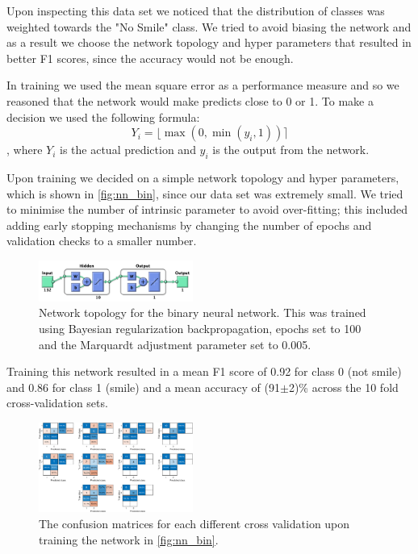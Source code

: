 \documentclass[%
 reprint,
 amsmath,amssymb,
 aps,
]{revtex4-1}
\newcommand{\round}[1]{\ensuremath{\lfloor#1\rceil}}
\begin{document}
\par{Upon inspecting this data set we noticed that the distribution of classes was weighted towards the "No Smile" class. We tried to avoid biasing the network and as a result we choose the network topology and hyper parameters that resulted in better F1 scores, since the accuracy would not be enough.}
\par{In training we used the mean square error as a performance measure and so we reasoned that the network would make predicts close to 0 or 1. To make a decision we used the following formula:
\begin{equation}
Y_i = \round{\max(0, \min(y_i, 1))}
\end{equation}
, where $Y_i$ is the actual prediction and $y_i$ is the output from the network.}
\par{Upon training we decided on a simple network topology and hyper parameters, which is shown in \autoref{fig:nn_bin}, since our data set was extremely small. We tried to minimise the number of intrinsic parameter to avoid over-fitting; this included adding early stopping mechanisms by changing the number of epochs and validation checks to a smaller number.}

\begin{figure}
    \centering
    \includegraphics[width=0.45\textwidth]{binarytopology.png}
    \caption{Network topology for the binary neural network. This was trained using Bayesian regularization backpropagation\cite{trainbr}, epochs set to 100 and the Marquardt adjustment parameter set to 0.005.}
    \label{fig:nn_bin}
\end{figure}

\par{Training this network resulted in a mean F1 score of 0.92 for class 0 (not smile) and 0.86 for class 1 (smile) and a mean accuracy of (91$\pm$2)\% across the 10 fold cross-validation sets.}

\begin{figure}
    \centering
    \includegraphics[width=0.45\textwidth]{binarynn.eps}
    \caption{The confusion matrices for each different cross validation upon training the network in \autoref{fig:nn_bin}.}
    \label{fig:nn_bin_results}
\end{figure}
\end{document}
